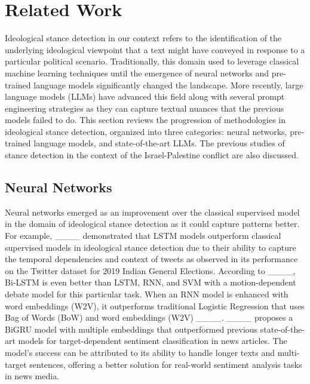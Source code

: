 \section{Related Work}
\label{rw}
Ideological stance detection in our context refers to the identification of the underlying ideological viewpoint that a text might have conveyed in response to a particular political scenario. Traditionally, this domain used to leverage classical machine learning techniques until the emergence of neural networks and pre-trained language models significantly changed the landscape. More recently, large language models (LLMs) have advanced this field along with several prompt engineering strategies as they can capture textual nuances that the previous models failed to do. This section reviews the progression of methodologies in ideological stance detection, organized into three categories: neural networks, pre-trained language models, and state-of-the-art LLMs. The previous studies of stance detection in the context of the Israel-Palestine conflict are also discussed. 

\subsection*{\textbf{Neural Networks}}
Neural networks emerged as an improvement over the classical supervised model in the domain of ideological stance detection as it could capture patterns better. For example, ____ demonstrated that LSTM models outperform classical supervised models in ideological stance detection due to their ability to capture the temporal dependencies and context of tweets as observed in its performance on the Twitter dataset for 2019 Indian General Elections. According to ____, Bi-LSTM is even better than LSTM, RNN, and SVM with a motion-dependent debate model for this particular task. When an RNN model is enhanced with word embeddings (W2V), it outperforms traditional Logistic Regression that uses Bag of Words (BoW) and word embeddings (W2V) ____. ____ proposes a BiGRU model with multiple embeddings that outperformed previous state-of-the-art models for target-dependent sentiment classification in news articles. The model's success can be attributed to its ability to handle longer texts and multi-target sentences, offering a better solution for real-world sentiment analysis tasks in news media.

